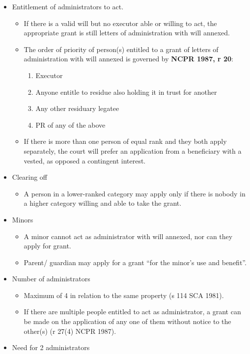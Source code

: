 \documentclass[
]{article}
\providecommand{\tightlist}{%
  \setlength{\itemsep}{0pt}\setlength{\parskip}{0pt}}
\begin{document}
\begin{itemize}
\tightlist
\item
  Entitlement of administrators to act.

  \begin{itemize}
  \tightlist
  \item
    If there is a valid will but no executor able or willing to act, the
    appropriate grant is still letters of administration with will
    annexed.
  \item
    The order of priority of person(s) entitled to a grant of letters of
    administration with will annexed is governed by \textbf{NCPR 1987, r
    20}:

    \begin{enumerate}
    \def\labelenumi{\arabic{enumi}.}
    \tightlist
    \item
      Executor
    \item
      Anyone entitle to residue also holding it in trust for another
    \item
      Any other residuary legatee
    \item
      PR of any of the above
    \end{enumerate}
  \item
    If there is more than one person of equal rank and they both apply
    separately, the court will prefer an application from a beneficiary
    with a vested, as opposed a contingent interest.
  \end{itemize}
\item
  Clearing off

  \begin{itemize}
  \tightlist
  \item
    A person in a lower-ranked category may apply only if there is
    nobody in a higher category willing and able to take the grant.
  \end{itemize}
\item
  Minors

  \begin{itemize}
  \tightlist
  \item
    A minor cannot act as administrator with will annexed, nor can they
    apply for grant.
  \item
    Parent/ guardian may apply for a grant ``for the minor's use and
    benefit''.
  \end{itemize}
\item
  Number of administrators

  \begin{itemize}
  \tightlist
  \item
    Maximum of 4 in relation to the same property (s 114 SCA 1981).
  \item
    If there are multiple people entitled to act as administrator, a
    grant can be made on the application of any one of them without
    notice to the other(s) (r 27(4) NCPR 1987).
  \end{itemize}
\item
  Need for 2 administrators


\end{itemize}
\end{document}
